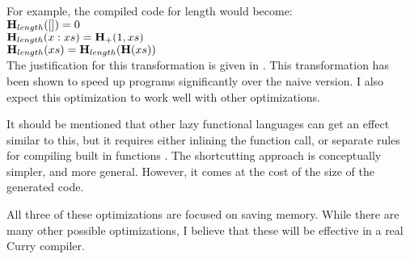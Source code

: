 For example, the compiled code for length would become:\\
$\mbox{\bf H$_{length}$}([]) = 0$\\
$\mbox{\bf H$_{length}$}(x:xs) = \mbox{\bf H$_{+}$}(1, xs)$\\
$\mbox{\bf H$_{length}$}(xs) = \mbox{\bf H}_{length}(\mbox{\bf H}(xs))$\\

The justification for this transformation is given in \cite{shortcutting}.
This transformation has been shown to speed up programs significantly over the naive version.
I also expect this optimization to work well with other optimizations.

It should be mentioned that other lazy functional languages can get an effect similar to this,
but it requires either inlining the function call,
or separate rules for compiling built in functions \cite{functional_PeytonJones}.
The shortcutting approach is conceptually simpler, and more general.
However, it comes at the cost of the size of the generated code.

All three of these optimizations are focused on saving memory.
While there are many other possible optimizations, I believe that these will be effective in a real Curry compiler.

